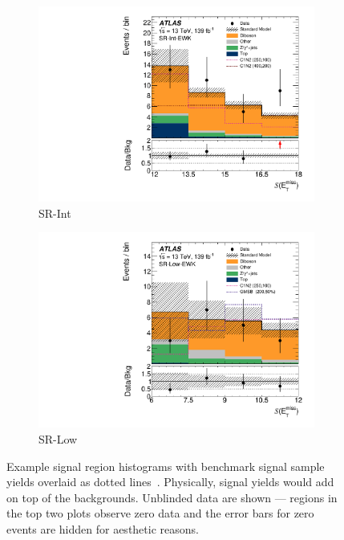 \begin{figure}[tp]
\begin{subfigure}{0.495\textwidth}
\includegraphics[width=\textwidth]{figures/2ljets_sr_int_met_sig.pdf}
\caption{SR-Int}
\end{subfigure}
\hfill
\begin{subfigure}{0.495\textwidth}
\centering
\includegraphics[width=\textwidth]{figures/2ljets_sr_low_met_sig.pdf}
\caption{SR-Low}
\end{subfigure}
\caption[
Example signal region histograms with benchmark signal sample yields overlaid
]{%
Example signal region histograms with benchmark signal sample yields overlaid
as dotted lines~\cite{atlas2022searches}.
Physically, signal yields would add on top of the backgrounds.
Unblinded data are shown --- regions in the top two plots observe zero data
and the error bars for zero events are hidden for aesthetic reasons.%
}
\label{fig:2ljets_signal_examples}
\end{figure}

